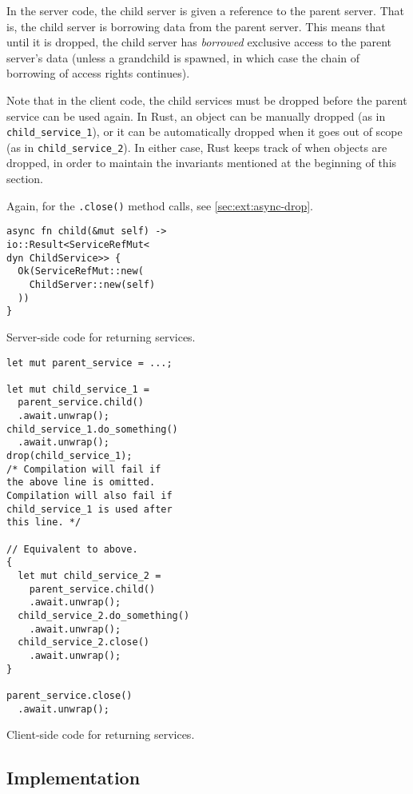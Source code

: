 \documentclass[11pt, twocolumn]{article}
\begin{document}
In the server code, the child server is given a reference to the parent server. That is, the child server is borrowing data from the parent server. This means that until it is dropped, the child server has \textit{borrowed} exclusive access to the parent server's data (unless a grandchild is spawned, in which case the chain of borrowing of access rights continues).

Note that in the client code, the child services must be dropped before the parent service can be used again. In Rust, an object can be manually dropped (as in \texttt{child\_service\_1}), or it can be automatically dropped when it goes out of scope (as in \texttt{child\_service\_2}). In either case, Rust keeps track of when objects are dropped, in order to maintain the invariants mentioned at the beginning of this section.

Again, for the \texttt{.close()} method calls, see \cref{sec:ext:async-drop}.

\begin{listing}
\begin{verbatim}
async fn child(&mut self) ->
io::Result<ServiceRefMut<
dyn ChildService>> {
  Ok(ServiceRefMut::new(
    ChildServer::new(self)
  ))
}
\end{verbatim}
\caption{Server-side code for returning services.}
\label{lst:returning-services:server}
\end{listing}

\begin{listing}
\begin{verbatim}
let mut parent_service = ...;

let mut child_service_1 =
  parent_service.child()
  .await.unwrap();
child_service_1.do_something()
  .await.unwrap();
drop(child_service_1);
/* Compilation will fail if
the above line is omitted.
Compilation will also fail if
child_service_1 is used after
this line. */

// Equivalent to above.
{
  let mut child_service_2 =
    parent_service.child()
    .await.unwrap();
  child_service_2.do_something()
    .await.unwrap();
  child_service_2.close()
    .await.unwrap();
}

parent_service.close()
  .await.unwrap();
\end{verbatim}
\caption{Client-side code for returning services.}
\label{lst:returning-services:client}
\end{listing}

\subsection{Implementation}
\end{document}
